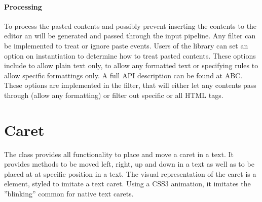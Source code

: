 
\paragraph{Processing} To process the pasted contents and possibly prevent inserting the contents to the editor an  will be generated and passed through the input pipeline. Any filter can be implemented to treat or ignore paste events. Users of the library can set an option on instantiation to determine how to treat pasted contents. These options include to allow plain text only, to allow any formatted text or specifying rules to allow specific formattings only. A full API description can be found at ABC. These options are implemented in the  filter, that will either let any contents pass through (allow any formatting) or filter out specific or all HTML tags.




\section{Caret}
\label{subsec:caret}

The  class provides all functionality to place and move a caret in a text. It provides methods to be moved left, right, up and down in a text as well as to be placed at at specific position in a text. The visual representation of the caret is a  element, styled to imitate a text caret. Using a CSS3 animation, it imitates the ''blinking'' common for native text carets.

